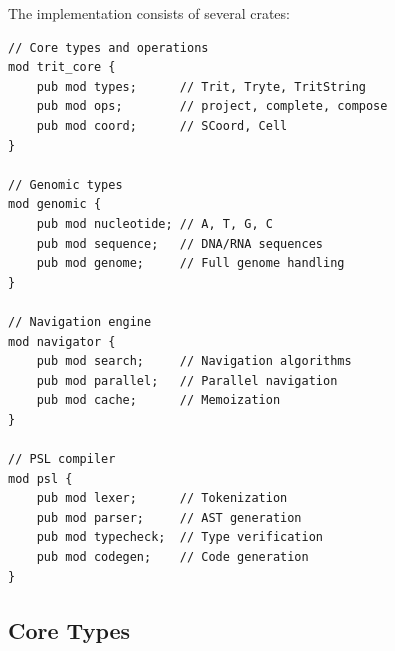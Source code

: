 \documentclass[twocolumn,10pt]{article}
\theoremstyle{remark}
\begin{document}
The implementation consists of several crates:

\begin{lstlisting}[style=rust]
// Core types and operations
mod trit_core {
    pub mod types;      // Trit, Tryte, TritString
    pub mod ops;        // project, complete, compose
    pub mod coord;      // SCoord, Cell
}

// Genomic types
mod genomic {
    pub mod nucleotide; // A, T, G, C
    pub mod sequence;   // DNA/RNA sequences
    pub mod genome;     // Full genome handling
}

// Navigation engine
mod navigator {
    pub mod search;     // Navigation algorithms
    pub mod parallel;   // Parallel navigation
    pub mod cache;      // Memoization
}

// PSL compiler
mod psl {
    pub mod lexer;      // Tokenization
    pub mod parser;     // AST generation
    pub mod typecheck;  // Type verification
    pub mod codegen;    // Code generation
}
\end{lstlisting}

\subsection{Core Types}
\end{document}
